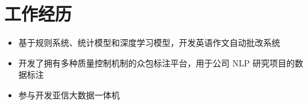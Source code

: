 \section{工作经历}
\begin{itemize}
  \item 基于规则系统、统计模型和深度学习模型，开发英语作文自动批改系统
  \item 开发了拥有多种质量控制机制的众包标注平台，用于公司 NLP 研究项目的数据标注
\end{itemize}

\begin{itemize}
  \item 参与开发亚信大数据一体机
\end{itemize}

